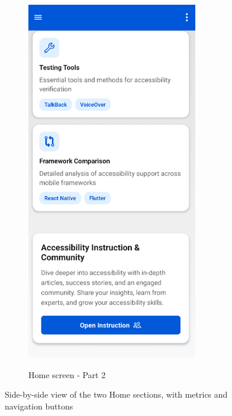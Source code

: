\begin{figure}[ht]
\begin{subfigure}[b]{0.48\textwidth}
        \label{fig:home-left}
    \end{subfigure}
    \hfill
    \begin{subfigure}[b]{0.48\textwidth}
        \centering
        \includegraphics[width=\linewidth, alt={Second part of the Home Screen}]{img/home2.png}
        \caption{Home screen - Part 2}
        \label{fig:home-right}
    \end{subfigure}
    \caption{Side-by-side view of the two Home sections, with metrics and navigation buttons}
    \label{fig:home_screens_sidebyside}
\end{figure}

